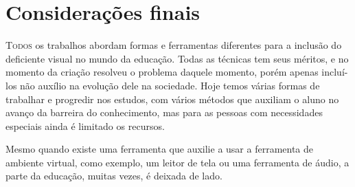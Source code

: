 \section{Considerações finais}
\lettrine{T}{odos} os trabalhos abordam formas e ferramentas diferentes para a inclusão do deficiente visual no mundo da educação. 
Todas as técnicas tem seus méritos, e no momento da criação resolveu o problema daquele momento, porém apenas incluí-los 
não auxílio na evolução dele na sociedade. Hoje temos várias formas de trabalhar e progredir nos estudos, com vários métodos 
que auxiliam o aluno no avanço da barreira do conhecimento, mas para as pessoas com necessidades especiais ainda é limitado 
os recursos.

Mesmo quando existe uma ferramenta que auxilie a usar a ferramenta de ambiente virtual, como exemplo, um leitor de 
tela ou uma ferramenta de áudio, a parte da educação, muitas vezes, é deixada de lado.